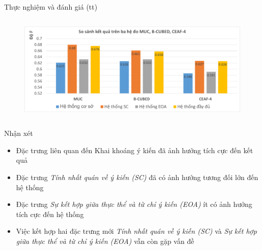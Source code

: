 \documentclass[9pt,xcolor=table,hyperref=unicode]{beamer}
\begin{document}
		\begin{frame}[t]{Thực nghiệm và đánh giá (tt)}								
			\begin{columns}[t]
				\begin{column}{\textwidth}
					\begin{figure}[H] 			
						\centering					
						\includegraphics[scale=0.38]{charts/chart_comparison.pdf}									
					\end{figure} 				
				\end{column}
			\end{columns}
			\begin{columns}[t]
				\begin{column}{\textwidth}
					\begin{block}{Nhận xét}
						\footnotesize		
						\begin{itemize}
							\item{Đặc trưng liên quan đến Khai khoáng ý kiến đã ảnh hưởng tích cực đến kết quả}
							\item{Đặc trưng \textit{Tính nhất quán về ý kiến (SC)} đã có ảnh hưởng tương đối lớn đến hệ thống}
							\item{Đặc trưng \textit{Sự kết hợp giữa thực thể và từ chỉ ý kiến (EOA)} ít có ảnh hưởng tích cực đến hệ thống}
							\item{Việc kết hợp hai đặc trưng mới \textit{Tính nhất quán về ý kiến (SC)} và \textit{Sự kết hợp giữa thực thể và từ chỉ ý kiến (EOA)} vẫn còn gặp vấn đề}
						\end{itemize}			
					\end{block}
				\end{column}				
			\end{columns}						
		\end{frame}					
\end{document}
